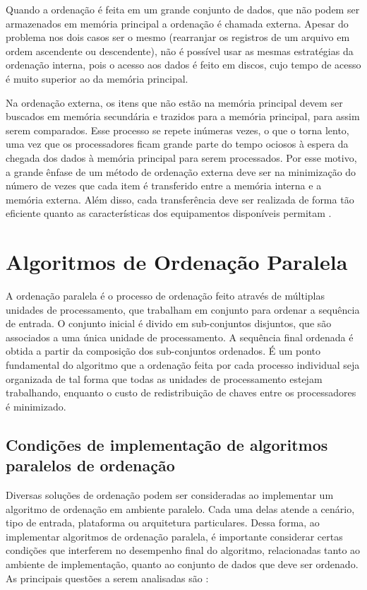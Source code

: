 Quando a ordenação é feita em um grande conjunto de dados, que não podem ser armazenados em memória principal a ordenação é chamada externa. Apesar do problema nos dois casos ser o mesmo (rearranjar os registros de um arquivo em ordem ascendente ou descendente), não é possível usar as mesmas estratégias da ordenação interna, pois o acesso aos dados é feito em discos, cujo tempo de acesso é muito superior ao da memória principal.  %

Na ordenação externa, os itens que não estão na memória principal devem ser buscados em memória secundária e trazidos para a memória principal, para assim serem comparados. Esse processo se repete inúmeras vezes, o que o torna lento, uma vez que os processadores ficam grande parte do tempo ociosos à espera da chegada dos dados à memória principal para serem processados. Por esse motivo, a grande ênfase de um método de ordenação externa deve ser na minimização do número de vezes que cada item é transferido entre a memória interna e a memória externa. Além disso, cada transferência deve ser realizada de forma tão eficiente quanto as características dos equipamentos disponíveis permitam \cite{Ziviani:2007}.



\section{Algoritmos de Ordenação Paralela}

A ordenação paralela é o processo  de ordenação feito através de múltiplas unidades de processamento, que trabalham em conjunto para ordenar a sequência de entrada. O conjunto inicial é divido em sub-conjuntos disjuntos, que são associados a uma única unidade de processamento. A sequência final ordenada é obtida a partir da composição dos sub-conjuntos ordenados. É um ponto fundamental do algoritmo que a ordenação feita por cada processo individual seja organizada de tal forma que todas as unidades de processamento estejam trabalhando, enquanto o custo de redistribuição de chaves entre os processadores é minimizado. 



\subsection{Condições de implementação de algoritmos paralelos de ordenação}
 
Diversas soluções de ordenação podem ser consideradas ao implementar um algoritmo de ordenação em ambiente paralelo. Cada uma delas atende a cenário, tipo de entrada, plataforma ou arquitetura particulares. Dessa forma, ao implementar algoritmos de ordenação paralela, é importante considerar certas condições que interferem no desempenho final do algoritmo, relacionadas tanto ao ambiente de implementação, quanto ao conjunto de dados que deve ser ordenado. As principais questões a serem analisadas são \cite{Kale:2010} :


